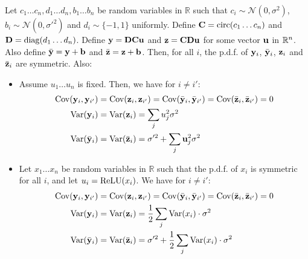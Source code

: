 \begin{lemma}
Let $c_{1} \ldots c_{n}, d_{1} \ldots d_{n}, b_{1} \ldots b_{n}$ be random variables in $\mathbb{R}$ such that $c_{i}\sim\mathcal{N}(0,\sigma^{2})$, $b_{i}\sim\mathcal{N}(0,\sigma'^{2})$ and $d_{i}\sim\{-1,1\}$ uniformly.
Define $\mathbf{C} = \mathrm{circ}(c_{1} \ldots c_{n})$ and $\mathbf{D} = \mathrm{diag} (d_{1} \ldots d_{n})$.
Define $\mathbf{y} = \mathbf{D} \mathbf{C} \mathbf{u}$ and $\mathbf{z} = \mathbf{C} \mathbf{D} \mathbf{u}$ for some vector $\mathbf{u}$ in ${\mathbb{R}}^{n}$.
Also define $\bar{\mathbf{y}} = \mathbf{y} + \mathbf{b}$ and $\bar{\mathbf{z}} = \mathbf{z} + \mathbf{b}$.
Then, for all $i$, the p.d.f. of $\mathbf{y}_{i}$, $\bar{\mathbf{y}}_{i}$, $\mathbf{z}_{i}$ and $\bar{\mathbf{z}}_{i}$ are symmetric.
Also:
\begin{itemize}
  \item Assume $u_1 \ldots u_n$ is fixed. Then, we have for $i \neq i'$:
  \begin{align*}
    \mathrm{Cov}(\mathbf{y}_i, \mathbf{y}_{i'}) & = \mathrm{Cov}(\mathbf{z}_i, \mathbf{z}_{i'}) = \mathrm{Cov}(\bar{\mathbf{y}}_i, \bar{\mathbf{y}}_{i'}) = \mathrm{Cov}(\bar{\mathbf{z}}_i,\bar{\mathbf{z}}_{i'}) = 0 \\
    \mathrm{Var}(\mathbf{y}_i) &= \mathrm{Var}(\mathbf{z}_{i}) = \sum_{j} u_{j}^{2}\sigma^{2} \\
    \mathrm{Var}(\bar{\mathbf{y}}_{i}) & = \mathrm{Var}(\bar{\mathbf{z}}_{i}) = \sigma'^2 + \sum_{j} \mathbf{u}_{j}^{2} \sigma^{2}
  \end{align*}
  \item Let $x_{1}\ldots x_{n}$ be random variables in $\mathbb{R}$ such that the p.d.f. of $x_{i}$ is symmetric for all $i$, and let $u_{i} = \operatorname{ReLU}(x_{i})$.
    We have for $i\neq i':$
  \begin{align*}
    \mathrm{Cov}(\mathbf{y}_i, \mathbf{y}_{i'}) & = \mathrm{Cov}(\mathbf{z}_{i}, \mathbf{z}_{i'}) = \mathrm{Cov}(\bar{\mathbf{y}}_{i}, \bar{\mathbf{y}}_{i'}) = \mathrm{Cov}(\bar{\mathbf{z}}_i, \bar{\mathbf{z}}_{i'})= 0 \\ 
    \mathrm{Var}(\mathbf{y}_i) & = \mathrm{Var}(\mathbf{z}_i) = \frac{1}{2} \sum_j \mathrm{Var}(x_i) \cdot \sigma^2 \\
    \mathrm{Var}(\bar{\mathbf{y}}_{i}) &= \mathrm{Var}(\bar{\mathbf{z}}_{i}) = \sigma'^2 + \frac{1}{2} \sum_{j} \mathrm{Var}(x_{i}) \cdot \sigma^2
  \end{align*}
\end{itemize}
\label{lemma:covariance}
\end{lemma}


